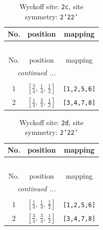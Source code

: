 \documentclass[fleqn,8pt]{jsarticle}
\begin{document}
\renewcommand{\arraystretch}{1.2}
\begin{longtable}{ccc}
\caption{Wyckoff site: {\tt 2c}, site symmetry: {\tt 2'22'}}
 \\
 \hline \hline
No. & position & mapping \\ \hline \endfirsthead

\multicolumn{2}{l}{\tablename\ \thetable{}} \\
 \hline \hline
No. & position & mapping \\ \hline \endhead

 \hline \hline
\multicolumn{2}{r}{\footnotesize\it continued ...} \\ \endfoot

 \hline \hline
\multicolumn{2}{r}{} \\ \endlastfoot

1 & $\left[ \frac{3}{4},\, \frac{1}{4},\, \frac{1}{2} \right]$ & {\tt [1,2,5,6]} \\ \hline
2 & $\left[ \frac{1}{4},\, \frac{3}{4},\, \frac{1}{2} \right]$ & {\tt [3,4,7,8]} \\
\end{longtable}
\renewcommand{\arraystretch}{1.2}
\begin{longtable}{ccc}
\caption{Wyckoff site: {\tt 2d}, site symmetry: {\tt 2'22'}}
 \\
 \hline \hline
No. & position & mapping \\ \hline \endfirsthead

\multicolumn{2}{l}{\tablename\ \thetable{}} \\
 \hline \hline
No. & position & mapping \\ \hline \endhead

 \hline \hline
\multicolumn{2}{r}{\footnotesize\it continued ...} \\ \endfoot

 \hline \hline
\multicolumn{2}{r}{} \\ \endlastfoot

1 & $\left[ \frac{1}{4},\, \frac{1}{4},\, \frac{1}{2} \right]$ & {\tt [1,2,5,6]} \\ \hline
2 & $\left[ \frac{3}{4},\, \frac{3}{4},\, \frac{1}{2} \right]$ & {\tt [3,4,7,8]} \\
\end{longtable}
\renewcommand{\arraystretch}{1.2}
\end{document}

